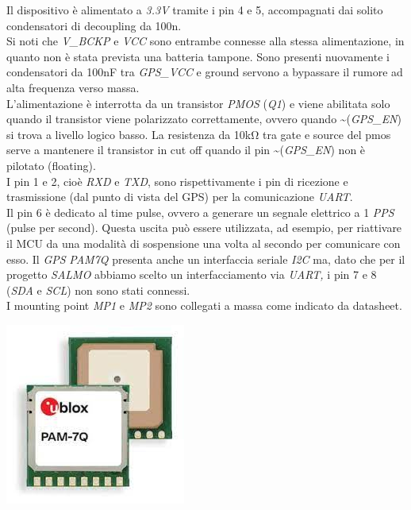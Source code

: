 \noindent Il dispositivo è alimentato a \emph{3.3V} tramite i pin 4 e 5,
accompagnati dai solito condensatori di decoupling da 100n.\\
Si noti che \emph{V\_BCKP} e \emph{VCC} sono entrambe connesse alla stessa
alimentazione, in quanto non è stata prevista una batteria tampone. Sono
presenti nuovamente i condensatori da 100nF tra \emph{GPS\_VCC} e ground
servono a bypassare il rumore ad alta frequenza verso massa.\\
L'alimentazione è interrotta da un transistor \emph{PMOS} (\emph{Q1}) e
viene abilitata solo quando il transistor viene polarizzato
correttamente, ovvero quando \textasciitilde(\emph{GPS\_EN}) si trova a
livello logico basso. La resistenza da 10kΩ tra gate e source del pmos
serve a mantenere il transistor in cut off quando il pin
\textasciitilde(\emph{GPS\_EN}) non è pilotato (floating).\\
I pin 1 e 2, cioè \emph{RXD} e \emph{TXD}, sono rispettivamente i pin di
ricezione e trasmissione (dal punto di vista del GPS) per la comunicazione \emph{UART}.\\
Il pin 6 è dedicato al time pulse, ovvero a generare un segnale
elettrico a 1 \emph{PPS} (pulse per second). Questa uscita può essere
utilizzata, ad esempio, per riattivare il MCU da una modalità di
sospensione una volta al secondo per comunicare con esso. Il \emph{GPS}
\emph{PAM7Q} presenta anche un interfaccia seriale \emph{I2C} ma, dato
che per il progetto \emph{SALMO} abbiamo scelto un interfacciamento via
\emph{UART,} i pin 7 e 8 (\emph{SDA} e \emph{SCL}) non sono stati connessi.\\
I mounting point \emph{MP1} e \emph{MP2} sono collegati a massa come
indicato da datasheet.

\begin{center}
\includegraphics[scale=0.8]{figures/image30.jpg}
\captionsetup{type=figure}
\end{center}

